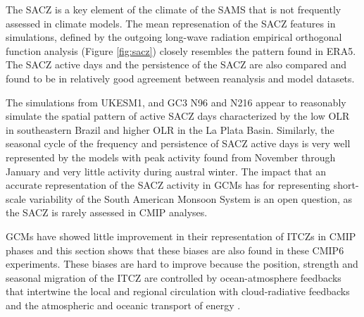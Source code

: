 
 The SACZ is a key element of the climate of the SAMS \citep{carvalho2004,jorgetti2014,van2015dynamical,zilli2019} that is not frequently assessed in climate models.  
 The mean represenation of the SACZ features in  simulations, defined by the outgoing long-wave radiation empirical orthogonal function analysis (Figure \ref{fig:sacz}) closely resembles the pattern found in ERA5. The SACZ active days and the persistence of the SACZ are also compared and found to be in relatively good agreement between reanalysis and model datasets.
 
The simulations from UKESM1, and GC3 N96 and N216 appear to reasonably simulate the spatial pattern of active SACZ days characterized by the low OLR in southeastern Brazil and higher OLR in the La Plata Basin. Similarly, the seasonal cycle of the frequency and persistence of SACZ active days is very well represented by the models with peak activity found from November through January and very little activity during austral winter. The impact that an accurate representation of the SACZ activity in GCMs has for representing short-scale variability of the South American Monsoon System is an open question, as the SACZ is rarely assessed in CMIP analyses.

GCMs have showed little improvement in their representation of ITCZs in CMIP phases\citep{oueslati2015} and this section shows that these biases are also found in these CMIP6 experiments. These biases are hard to improve because the position, strength and seasonal migration of the ITCZ are controlled by ocean-atmosphere feedbacks that intertwine the local and regional circulation with cloud-radiative feedbacks and the atmospheric and oceanic transport of energy \citep{schneider2014,oueslati2015,byrne2016,byrne2020}. 


